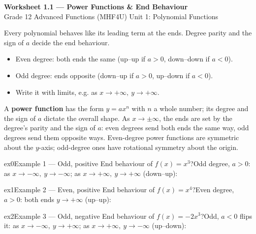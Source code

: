 \documentclass[11pt]{article}
\begin{document}
\begin{center}
{\LARGE\bfseries\color{titleblue}Worksheet 1.1 --- Power Functions \& End Behaviour}\\[2pt]
{\small Grade 12 Advanced Functions (MHF4U) \textperiodcentered{} Unit 1: Polynomial Functions}
\end{center}

\begin{ideabox}
Every polynomial behaves like its leading term at the ends. Degree parity and the sign of $a$ decide the end behaviour.
\begin{itemize}[leftmargin=*,itemsep=2pt]
  \item Even degree: both ends the same (up–up if $a>0$, down–down if $a<0$).
  \item Odd degree: ends opposite (down–up if $a>0$, up–down if $a<0$).
  \item Write it with limits, e.g. as $x\to+\infty,\ y\to+\infty$.
\end{itemize}
\end{ideabox}

\begin{learnbox}
A \textbf{power function} has the form $y=ax^n$ with $n$ a whole number; its degree and the sign of $a$ dictate the overall shape.
As $x\to\pm\infty$, the ends are set by the degree's parity and the sign of $a$: even degrees send both ends the same way, odd degrees send them opposite ways.
Even-degree power functions are symmetric about the $y$-axis; odd-degree ones have rotational symmetry about the origin.
\end{learnbox}


\begin{example}{ex0}{Example 1 --- Odd, positive}
End behaviour of $f(x)=x^3$?\soln Odd degree, $a>0$: as $x\to-\infty,\ y\to-\infty$; as $x\to+\infty,\ y\to+\infty$ (down–up):
\end{example}

\begin{example}{ex1}{Example 2 --- Even, positive}
End behaviour of $f(x)=x^4$?\soln Even degree, $a>0$: both ends $y\to+\infty$ (up–up):
\end{example}

\begin{example}{ex2}{Example 3 --- Odd, negative}
End behaviour of $f(x)=-2x^3$?\soln Odd, $a<0$ flips it: as $x\to-\infty,\ y\to+\infty$; as $x\to+\infty,\ y\to-\infty$ (up–down):
\end{example}
\end{document}
